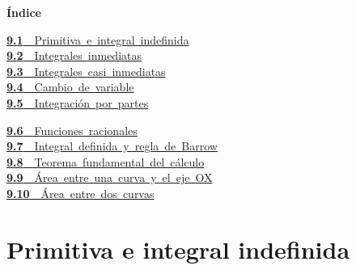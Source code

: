 \documentclass[11pt,a4paper]{article}
\begin{document}
\begin{tcolorbox}[colback=fmsurface,colframe=fmsurface,arc=3mm,left=4mm,right=4mm,top=2mm,bottom=2mm]
\small\textbf{Índice}\par\smallskip
\begin{minipage}[t]{0.49\linewidth}\small \mbox{\hyperlink{sec1}{\textbf{\color{fmgreen}9.1}\ \ Primitiva e integral indefinida}}\\[3pt]
\mbox{\hyperlink{sec2}{\textbf{\color{fmgreen}9.2}\ \ Integrales inmediatas}}\\[3pt]
\mbox{\hyperlink{sec3}{\textbf{\color{fmgreen}9.3}\ \ Integrales casi inmediatas}}\\[3pt]
\mbox{\hyperlink{sec4}{\textbf{\color{fmgreen}9.4}\ \ Cambio de variable}}\\[3pt]
\mbox{\hyperlink{sec5}{\textbf{\color{fmgreen}9.5}\ \ Integración por partes}}\\[3pt]\end{minipage}\hfill\begin{minipage}[t]{0.49\linewidth}\small \mbox{\hyperlink{sec6}{\textbf{\color{fmgreen}9.6}\ \ Funciones racionales}}\\[3pt]
\mbox{\hyperlink{sec7}{\textbf{\color{fmgreen}9.7}\ \ Integral definida y regla de Barrow}}\\[3pt]
\mbox{\hyperlink{sec8}{\textbf{\color{fmgreen}9.8}\ \ Teorema fundamental del cálculo}}\\[3pt]
\mbox{\hyperlink{sec9}{\textbf{\color{fmgreen}9.9}\ \ Área entre una curva y el eje OX}}\\[3pt]
\mbox{\hyperlink{sec10}{\textbf{\color{fmgreen}9.10}\ \ Área entre dos curvas}}\\[3pt]\end{minipage}
\end{tcolorbox}

\section{Primitiva e integral indefinida}\hypertarget{sec1}{}
\end{document}
